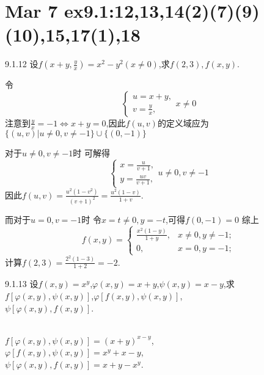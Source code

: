 \section{Mar 7 ex9.1:12,13,14(2)(7)(9)(10),15,17(1),18}

\begin{exercise}{9.1.12}
    设$f(x+y,\frac{y}{x})=x^2-y^2(x\neq0)$,求$f(2,3),f(x,y)$.
\end{exercise}
\begin{solution}
    令$$\begin{cases}
        u=x+y,\\
        v=\frac{y}{x},
    \end{cases}x\neq0$$
    注意到$\frac{y}{x}=-1\Leftrightarrow x+y=0$,因此$f(u,v)$的定义域应为$\{(u,v)|u\neq0,v\neq-1\}\cup\{(0,-1)\}$
    
    对于$u\neq0,v\neq-1$时
    可解得$$\begin{cases}
        x=\frac{u}{v+1},\\
        y=\frac{uv}{v+1},
    \end{cases}u\neq0,v\neq-1$$
    因此$f(u,v)=\frac{u^2(1-v^2)}{(v+1)^2}=\frac{u^2(1-v)}{1+v}$.

    而对于$u=0,v=-1$时
    令$x=t\neq0,y=-t$,可得$f(0,-1)=0$
    综上$$f(x,y)=\begin{cases}
        \frac{x^2(1-y)}{1+y},&x\neq0,y\neq-1;\\
        0,&x=0,y=-1;
    \end{cases}$$
    计算$f(2,3)=\frac{2^2(1-3)}{1+2}=-2$.
\end{solution}

\begin{exercise}{9.1.13}
    设$f(x,y)=x^y$,$\varphi(x,y)=x+y$,$\psi(x,y)=x-y$,求$f[\varphi(x,y),\psi(x,y)]$,$\varphi[f(x,y),\psi(x,y)]$,\\$\psi[\varphi(x,y),f(x,y)]$.
\end{exercise}
\begin{solution}\\
    $f[\varphi(x,y),\psi(x,y)]=(x+y)^{x-y}$,\\
    $\varphi[f(x,y),\psi(x,y)]=x^y+x-y$,\\
    $\psi[\varphi(x,y),f(x,y)]=x+y-x^y$.
\end{solution}

